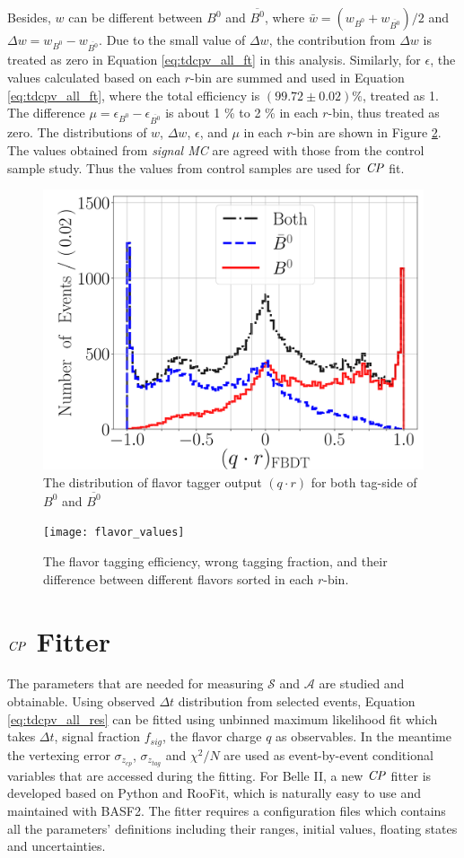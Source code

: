 Besides, $w$ can be different between $B^0$ and $\overline{B^0}$, where
$\bar{w} = (w_{B^0}+w_{\overline{B^0}})/2$ and $\Delta w = w_{B^0}-w_{\overline{B^0}}$. Due to the small value of $\Delta w$, the contribution from $\Delta w$ is treated as zero in Equation \ref{eq:tdcpv_all_ft} in this analysis. Similarly, for $\epsilon$, the values calculated based on each $r$-bin are summed and used in Equation \ref{eq:tdcpv_all_ft}, where the total efficiency is $(99.72\pm0.02)\%$, treated as 1. The difference $\mu = \epsilon_{B^0}-\epsilon_{\overline{B^0}} $ is about 1 \% to 2 \% in each $r$-bin, thus treated as zero. The distributions of $w$, $\Delta w$, $\epsilon$, and $\mu$ in each $r$-bin are shown in Figure \ref{fig:ft_wtag}. The values obtained from \textit{signal MC} are agreed with those from the control sample study\cite{abudinen2020first}. Thus the values from control samples are used for $\it{CP}$ fit. 
 \begin{figure}[htpb]
 	\centering
 	\includegraphics[width=0.7\linewidth]{figures/qr}
 	\caption{The distribution of flavor tagger output $(q\cdot r)$ for both tag-side of $B^0$ and $\overline{B^0}$}
 	\label{fig:ft_qr}
 	\end{figure}
 \begin{figure}[htpb]
 	\texttt{[image: flavor\_values]}
 	\caption{The flavor tagging efficiency, wrong tagging fraction, and their difference between different flavors sorted in each $r$-bin.}
 	\label{fig:ft_wtag}
 \end{figure}

\section{$\it{CP}$ Fitter}

The parameters that are needed for measuring $\mathcal{S}$ and $\mathcal{A}$ are studied and obtainable. Using observed $\Delta t$ distribution from selected events, Equation \ref{eq:tdcpv_all_res} can be fitted using unbinned maximum likelihood fit which takes $\Delta t$, signal fraction $f_{sig}$, the flavor charge $q$ as observables. In the meantime the vertexing error $\sigma_{z_{cp}}$, $\sigma_{z_{tag}}$ and $\chi^2/N$ are used as event-by-event conditional variables that are accessed during the fitting.
For Belle II, a new $\it{CP}$ fitter is developed based on Python and RooFit, which is naturally easy to use and maintained with BASF2. The fitter requires a configuration files which contains all the parameters' definitions including their ranges, initial values, floating states and uncertainties. 

